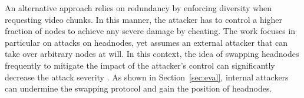 An alternative approach \cite{nguyen2014resilience} relies on redundancy by enforcing diversity when requesting video chunks. In this manner, the attacker has to control a higher fraction of nodes to achieve any severe damage by cheating. The work focuses in particular on attacks on headnodes, yet assumes an external attacker that can take over arbitrary nodes at will. In this context, the idea of swapping headnodes frequently to mitigate the impact of the attacker's control can significantly decrease the attack severity \cite{nguyen2016swap}.
As shown in Section~\ref{sec:eval}, internal attackers can undermine the swapping protocol and gain the position of headnodes.  







